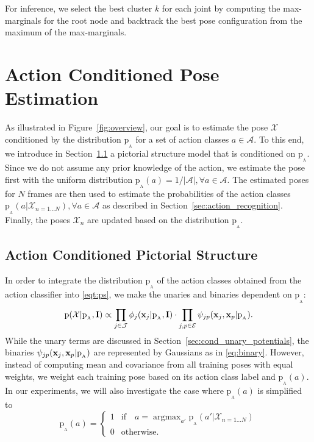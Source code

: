 \documentclass[a4paper, 10pt, conference]{ieeeconf}      \usepackage{FG2017}
\DeclareMathOperator*{\argmax}{argmax}
\begin{document}
For inference, we select the best cluster $k$ for each joint 
by computing the max-marginals for the root node and backtrack the best pose configuration from the maximum of the max-marginals.  

\section{Action Conditioned Pose Estimation}

As illustrated in Figure~\ref{fig:overview}, our goal is to estimate the pose $\mathcal{X}$ conditioned by the distribution $\mathrm{p_{_A}}$ for a set of action classes $a \in \mathcal{A}$. To this end, we introduce in Section~\ref{sec:action_cond_ps} a pictorial structure model that is conditioned on $\mathrm{p_{_A}}$. Since we do not assume any prior knowledge of the action, we estimate the pose first with the uniform distribution $\mathrm{p_{_A}}(a) = 1/\vert \mathcal{A} \vert, \forall a \in \mathcal{A} $. The estimated poses for $N$ frames are then used to estimate the probabilities of the action classes $\mathrm{p_{_A}}(a|\mathcal{X}_{n=1 \dots N}),  \forall a \in \mathcal{A} $ as described in Section~\ref{sec:action_recognition}. Finally, the poses $\mathcal{X}_n$ are updated based on the distribution $\mathrm{p_{_A}}$.   

\subsection{Action Conditioned Pictorial Structure}
\label{sec:action_cond_ps}

In order to integrate the distribution $\mathrm{p_{_A}}$ of the action classes obtained from the action classifier into \eqref{eqt:ps}, we make the unaries and binaries dependent on $\mathrm{p_{_A}}$: 
\begin{equation}\label{eq:ps_cond}
\mathrm{p}(\mathcal{X}|\mathrm{p_{_A}},\bold{I}) \propto \prod_{j \in \mathcal{J}} \phi_j(\bold{x}_j|\mathrm{p_{_A}},\bold{I}) \cdot \prod_{j,p \in \mathcal{E}} \psi_{jp}(\bold{x}_j, \bold{x}_p|\mathrm{p_{_A}}). 
\end{equation} 
While the unary terms are discussed in Section~\ref{sec:cond_unary_potentials}, the binaries $\psi_{jp}(\bold{x}_j, \bold{x}_p|\mathrm{p_{_A}})$ are represented by Gaussians as in \eqref{eq:binary}. However, instead of computing mean and covariance from all training poses with equal weights, we weight each training pose based on its action class label and $\mathrm{p_{_A}}(a)$. In our experiments, we will also investigate the case where $\mathrm{p_{_A}}(a)$ is simplified to   
 \begin{equation}
 \label{eqt:best_ps}
\mathrm{p_{_A}}(a) = \begin{cases}
         1 & \text{if} \quad a=\argmax_{a'}\mathrm{p_{_A}}(a'|\mathcal{X}_{n=1 \dots N})\\
         0 & \text{otherwise.}
        \end{cases}
\end{equation}
\end{document}

